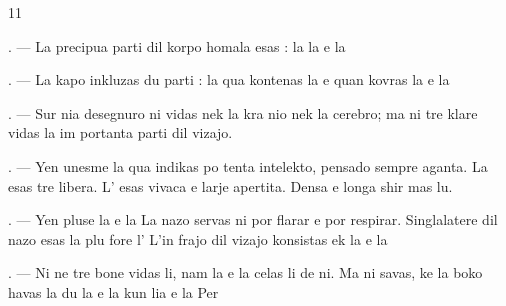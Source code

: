%

\begin{VUpage}[13]{11}
\VUsaut{4.0mm}
\VUsaut{2.0mm}
\VUsaut{2.4mm}
\VUsaut{3.0mm}

\VUsaut{3.0mm}

. --- La precipua parti dil korpo homala\nl
esas : la  la  e la 

. --- La kapo inkluzas du parti : la \nl
qua kontenas la  e quan kovras la \cc
{} e la 

. --- Sur nia desegnuro ni vidas nek la kra\cc
nio nek la cerebro; ma ni tre klare vidas la im\cc
portanta parti dil vizajo.

. --- Yen unesme la  qua indikas po\cc
tenta intelekto, pensado sempre aganta. La\nl
{} esas tre libera. L' esas vivaca e\nl
larje apertita. Densa  e longa  shir\cc
mas lu.

. --- Yen pluse la  e la  La nazo\nl
servas ni por flarar e por respirar. Singlalatere\nl
dil nazo esas la  plu fore l' L'in\cc
frajo dil vizajo konsistas ek la  e la \cc
{}

. --- Ni ne tre bone vidas li, nam la \cc
{} e la  celas li de ni. Ma ni\nl
savas, ke la boko havas la du  la \nl
e la  kun lia  e la  Per
\parplein
\end{VUpage}


